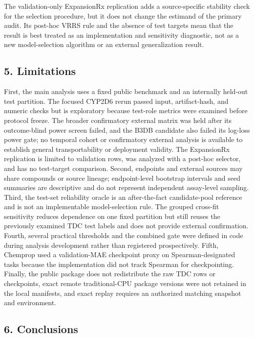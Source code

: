 \documentclass[
]{article}
\begin{document}
The validation-only ExpansionRx replication adds a source-specific stability
check for the selection procedure, but it does not change the estimand of the
primary audit. Its post-hoc VRRS rule and the absence of test targets mean that
the result is best treated as an implementation and sensitivity diagnostic,
not as a new model-selection algorithm or an external generalization result.

\subsection{5. Limitations}\label{limitations}

First, the main analysis uses a fixed public benchmark and an internally
held-out test partition. The focused CYP2D6 rerun passed input, artifact-hash,
and numeric checks but is exploratory because test-role metrics were examined
before protocol freeze. The broader confirmatory external matrix was held
after its outcome-blind power screen failed, and the B3DB candidate also
failed its log-loss power gate; no temporal cohort or confirmatory external
analysis is available to establish general transportability or deployment
validity. The ExpansionRx replication is limited to validation rows, was
analyzed with a post-hoc selector, and has no test-target comparison. Second,
endpoints
and external sources may share compounds or source lineage;
endpoint-level bootstrap intervals and seed summaries are descriptive
and do not represent independent assay-level sampling. Third, the
test-set reliability oracle is an after-the-fact candidate-pool
reference and is not an implementable model-selection rule. The grouped
cross-fit sensitivity reduces dependence on one fixed partition but still
reuses the previously examined TDC test labels and does not provide external
confirmation. Fourth,
several practical thresholds and the combined gate were defined in code
during analysis development rather than registered prospectively. Fifth,
Chemprop used a validation-MAE checkpoint proxy on Spearman-designated
tasks because the implementation did not track Spearman for
checkpointing. Finally, the public package does not redistribute the raw
TDC rows or checkpoints, exact remote traditional-CPU package versions
were not retained in the local manifests, and exact replay requires an
authorized matching snapshot and environment.

\subsection{6. Conclusions}\label{conclusions}
\end{document}
